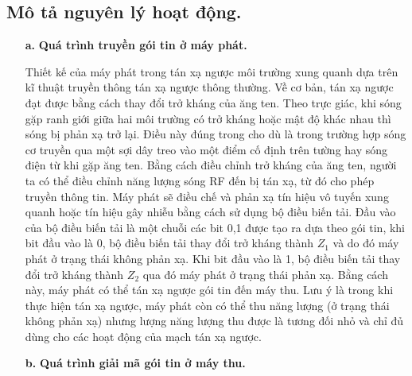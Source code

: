 \documentclass{uetgraduation}
\begin{document}
\subsection{Mô tả nguyên lý hoạt động.}
\begin{enumerate}
    \item [\textbf{a.}] \textbf{Quá trình truyền gói tin ở máy phát.}
    
    Thiết kế của máy phát trong tán xạ ngược môi trường xung quanh dựa trên kĩ thuật truyền thông tán xạ ngược thông thường. Về cơ bản, tán xạ ngược đạt được bằng cách thay đổi
    trở kháng của ăng ten. Theo trực giác, khi sóng gặp ranh giới giữa hai môi trường có trở kháng hoặc mật độ khác nhau thì sóng bị phản xạ trở lại. Điều này đúng trong cho dù
    là trong trường hợp sóng cơ truyền qua một sợi dây treo vào một điểm cố định trên tường hay sóng điện từ khi gặp ăng ten. Bằng cách điều chỉnh trở kháng của ăng ten, người ta
    có thể điều chỉnh năng lượng sóng RF đến bị tán xạ, từ đó cho phép truyền thông tin. Máy phát sẽ điều chế và phản xạ tín hiệu vô tuyến xung quanh hoặc tín hiệu gây nhiễu bằng
    cách sử dụng bộ điều biến tải. Đầu vào của bộ điều biến tải là một chuỗi các bit 0,1 được tạo ra dựa theo gói tin, khi bit đầu vào là 0, bộ điều biến tải thay đổi trở kháng
    thành $Z_1$ và do đó máy phát ở trạng thái không phản xạ. Khi bit đầu vào là 1, bộ điều biến tải thay đổi trở kháng thành $Z_2$ qua đó máy phát ở trạng thái phản xạ. Bằng cách
    này, máy phát có thể tán xạ ngược gói tin đến máy thu. Lưu ý là trong khi thực hiện tán xạ ngược, máy phát còn có thể thu năng lượng (ở trạng thái không phản xạ) nhưng lượng
    năng lượng thu được là tương đối nhỏ và chỉ đủ dùng cho các hoạt động của mạch tán xạ ngược.
    
    \item [\textbf{b.}] \textbf{Quá trình giải mã gói tin ở máy thu.}
    

\end{enumerate}
\end{document}
